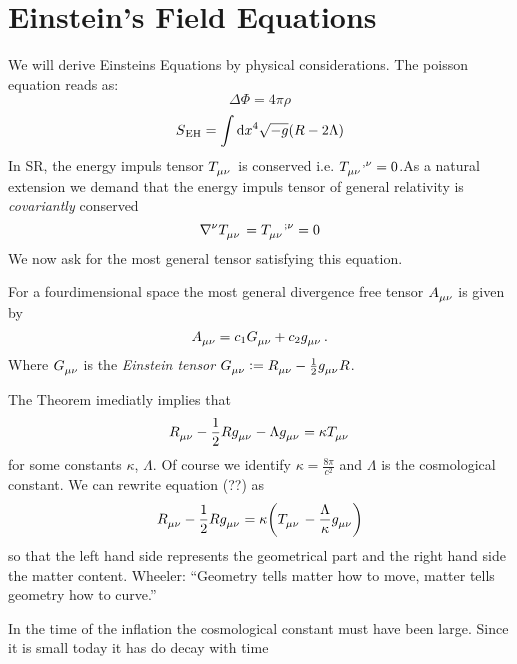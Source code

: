 \chapter{Einstein's Field Equations}
We will derive Einsteins Equations by physical considerations. The poisson
equation reads as:
\begin{equation}
\Delta\Phi=4\pi\rho
\end{equation}
\begin{equation}
S\textsubscript{EH}=\int\dif x^4 \sqrt{-g}(R-2\Lambda)
\end{equation}
In SR, the energy impuls tensor $\tensor{T}{_\mu_\nu}$ is conserved i.e.
$\tensor{T}{_\mu_\nu^{,\nu}}=0$.As a natural extension we demand that the energy
impuls tensor of general relativity is \emph{covariantly} conserved 
\begin{equation}
\tensor{\nabla}{^\nu}\tensor{T}{_\mu_\nu}=\tensor{T}{_\mu_\nu^{;\nu}}=0
\end{equation}
We now ask for the most general tensor satisfying this equation. 
\begin{theorem}[Lovelock]
For a fourdimensional space the most general divergence free tensor
$\tensor{A}{_\mu_\nu}$ is given by
\begin{equation}
\tensor{A}{_\mu_\nu}= c_1\tensor{G}{_\mu_\nu}+c_2\tensor{g}{_\mu_\nu}\, .
\end{equation}
Where $\tensor{G}{_\mu_\nu}$ is the \emph{Einstein tensor}
$\tensor{G}{_\mu_\nu}:=\tensor{R}{_\mu_\nu}-\frac{1}{2}\tensor{g}{_\mu_\nu}R$.
\end{theorem}
The Theorem imediatly implies that 
\begin{equation}
\tensor{R}{_\mu_\nu}-\frac{1}{2}R\tensor{g}{_\mu_\nu}-\Lambda\tensor{g}{_\mu_\nu}=\kappa\tensor{T}{_\mu_\nu}
\end{equation}
for some constants $\kappa$, $\Lambda$.
Of course we identify $\kappa=\frac{8\pi}{c^2}$ and $\Lambda$ is the
cosmological constant. We can rewrite equation (??) as
\begin{equation}
\tensor{R}{_\mu_\nu}-\frac{1}{2}R\tensor{g}{_\mu_\nu}
=\kappa\left(\tensor{T}{_\mu_\nu}-\frac{\Lambda}{\kappa}\tensor{g}{_\mu_\nu}\right)
\end{equation}
so that the left hand side represents the geometrical part and the right hand
side the matter content. 
Wheeler: ``Geometry tells matter how to move, matter tells geometry how to
curve.''
\begin{sidenote}
In the time of the inflation the cosmological constant must have been large.
Since it is small today it has do decay with time
\end{sidenote}
